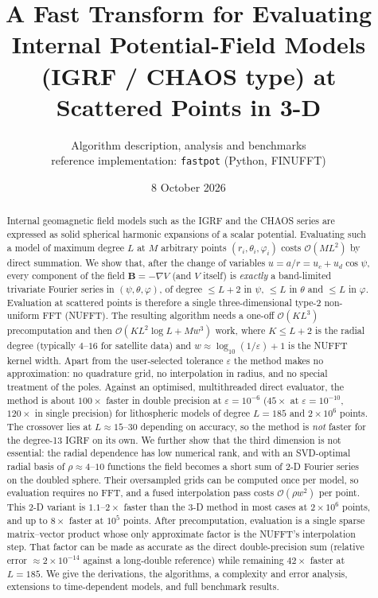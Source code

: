 \documentclass[11pt,a4paper]{article}
\title{A Fast Transform for Evaluating Internal Potential-Field Models\\
(IGRF / CHAOS type) at Scattered Points in 3-D}
\author{Algorithm description, analysis and benchmarks\\[2pt]
\small reference implementation: \texttt{fastpot} (Python, FINUFFT)}
\date{8 October 2026}
\theoremstyle{remark}
\newcommand{\eps}{\varepsilon}
\newcommand{\Oh}{\mathcal{O}}
\begin{document}
\maketitle

\begin{abstract}
Internal geomagnetic field models such as the IGRF and the CHAOS series are expressed as
solid spherical harmonic expansions of a scalar potential. Evaluating such a model of maximum
degree $L$ at $M$ arbitrary points $(r_i,\theta_i,\varphi_i)$ costs $\Oh(ML^2)$ by direct
summation. We show that, after the change of variables $u=a/r=u_c+u_d\cos\psi$, every
component of the field $\mathbf B=-\nabla V$ (and $V$ itself) is \emph{exactly} a
band-limited trivariate Fourier series in $(\psi,\theta,\varphi)$, of degree $\le L+2$ in
$\psi$, $\le L$ in $\theta$ and $\le L$ in $\varphi$. Evaluation at scattered points is
therefore a single three-dimensional type-2 non-uniform FFT (NUFFT). The resulting algorithm
needs a one-off $\Oh(KL^3)$ precomputation and then $\Oh(KL^2\log L + M w^3)$ work, where
$K\le L+2$ is the radial degree (typically $4$--$16$ for satellite data) and
$w\approx\log_{10}(1/\eps)+1$ is the NUFFT kernel width. Apart from the user-selected
tolerance $\eps$ the method makes no approximation: no quadrature grid, no interpolation in
radius, and no special treatment of the poles. Against an optimised, multithreaded direct
evaluator, the method is about $100\times$ faster in double precision at $\eps=10^{-6}$
($45\times$ at $\eps=10^{-10}$, $120\times$ in single precision) for lithospheric models of degree $L=185$
and $2\times10^6$ points. The crossover lies
at $L\approx 15$--$30$ depending on accuracy, so the method is \emph{not} faster for the
degree-13 IGRF on its own. We further show that the third dimension is not essential: the radial
dependence has low numerical rank, and with an SVD-optimal radial basis of $\rho\approx4$--$10$ functions the field
becomes a short sum of 2-D Fourier series on the doubled sphere. Their oversampled grids can be computed once per
model, so evaluation requires no FFT, and a fused interpolation pass costs $\Oh(\rho w^2)$ per point. This 2-D
variant is $1.1$--$2\times$ faster than the 3-D method in most cases at $2\times10^6$ points, and up to $8\times$ faster at
$10^5$ points. After precomputation, evaluation is a single sparse matrix--vector product whose only approximate factor
is the NUFFT's interpolation step. That factor can be made as accurate as the direct double-precision sum
(relative error $\approx2\times10^{-14}$ against a long-double reference) while remaining $42\times$ faster at $L=185$. We give the derivations, the algorithms, a complexity and error
analysis, extensions to time-dependent models, and full benchmark results.
\end{abstract}
\end{document}
